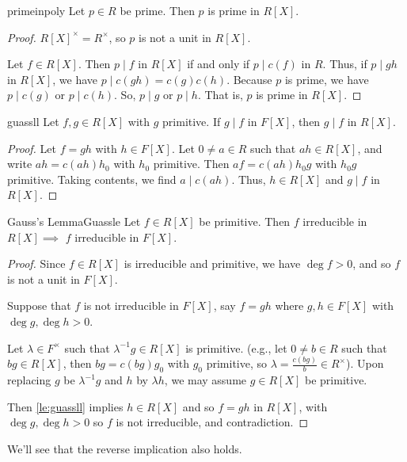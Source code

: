 \begin{corollary}{}{primeinpoly}
    Let \(p \in R\) be prime. Then \(p\) is prime in \(R[X]\).
\end{corollary}
\begin{proof}
    \(R[X]^\times = R^\times\), so \(p\) is not a unit in \(R[X]\).

    Let \(f \in R[X]\). Then \(p \mid f\) in \(R[X]\) if and only if \(p \mid c(f)\) in \(R\). Thus, if \(p \mid gh\) in \(R[X]\), we have \(p \mid c(gh) = c(g)c(h)\). Because \(p\) is prime, we have \(p \mid c(g)\) or \(p \mid c(h)\). So, \(p \mid g\) or \(p \mid h\). That is, \(p\) is prime in \(R[X]\).
\end{proof}
\begin{lemma}{}{guassll}
    Let \(f, g \in R[X]\) with \(g\) primitive. If \(g \mid f\) in \(F[X]\), then \(g\mid f\) in \(R[X]\).
\end{lemma}
\begin{proof}
    Let \(f = gh\) with \(h \in F[X]\). Let \(0 \neq a \in R\) such that \(ah \in R[X]\), and write \(ah = c(ah)h_0\) with \(h_0\) primitive. Then \(af = c(ah)h_0 g\) with \(h_0 g\) primitive. Taking contents, we find \(a \mid c(ah)\). Thus, \(h \in R[X]\) and \(g \mid f\) in \(R[X]\).
\end{proof}
\begin{lemma}{Gauss's Lemma}{Guassle}
    Let \(f \in R[X]\) be primitive. Then \(f\) irreducible in \(R[X]\implies\) \(f\) irreducible in \(F[X]\).
\end{lemma}
\begin{proof}
    Since \(f \in R[X]\) is irreducible and primitive, we have \(\deg f > 0\), and so \(f\) is not a unit in \(F[X]\).

    Suppose that \(f\) is not irreducible in \(F[X]\), say \(f = gh\) where \(g, h \in F[X]\) with \(\deg g, \deg h > 0\).

    Let \(\lambda \in F^\times \) such that \(\lambda^{-1}g \in R[X]\) is primitive. (e.g., let \(0 \neq b \in R\) such that \(bg \in R[X]\), then \(bg = c(bg)g_0\) with \(g_0\) primitive, so \(\lambda=\frac{c(bg)}{b}\in R^\times \)). Upon replacing \(g\) be \(\lambda^{-1}g\) and \(h\) by \(\lambda h\), we may assume \(g \in R[X]\) be primitive.

    Then \cref{le:guassll} implies \(h \in R[X]\) and so \(f = gh\) in \(R[X]\), with \(\deg g, \deg h > 0\) so \(f\) is not irreducible, and contradiction.
\end{proof}
\begin{remark}
    We'll see that the reverse implication also holds.
\end{remark}
